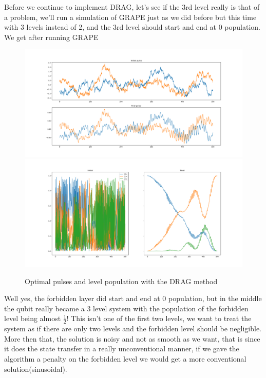 \documentclass[english, a4paper, 12pt, twoside]{article}
\numberwithin{equation}{section} %
\begin{document}
Before we continue to implement DRAG, let's see if the 3rd level really is that of a problem, we'll run a simulation of GRAPE just as we did before but this time with 3 levels instead of 2, and the 3rd level should start and end at 0 population. We get after running GRAPE
\begin{figure}[H]
    \centering
    \includegraphics[width=1\columnwidth]{Results/Before-Drag/pulses.png}
    \includegraphics[width=1\columnwidth]{Results/Before-Drag/population.png}
    \caption{Optimal pulses and level population with the DRAG method}
    \label{fig:before-DRAG} %
\end{figure}
Well yes, the forbidden layer did start and end at $0$ population, but in the middle the qubit really became a 3 level system with the population of the forbidden level being almost $\frac{1}{2}$! This isn't one of the first two levels, we want to treat the system as if there are only two levels and the forbidden level should be negligible. More then that, the solution is noisy and not as smooth as we want, that is since it does the state transfer in a really unconventional manner, if we gave the algorithm a penalty on the forbidden level we would get a more conventional solution(sinusoidal).
\end{document}

